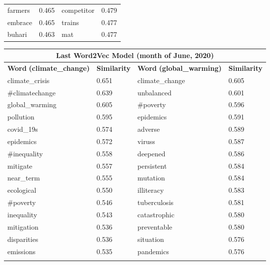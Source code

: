 \documentclass{paper}
\begin{document}
\begin{table}[ht]
\begin{subfigure}{0.49\textwidth}
\begin{tabularx}{\textwidth}{@{}XXXX@{}}
            farmers & 0.465 & competitor & 0.479\\\hdashline
            embrace & 0.465 & trains & 0.477\\\hdashline
            buhari & 0.463 & mat & 0.477\\\bottomrule
        \end{tabularx}
    \end{subfigure}
    \begin{subfigure}{0.49\textwidth}
        \centering
        \begin{tabularx}{\textwidth}{@{}XXXX@{}}\toprule
            \multicolumn{4}{c}{\textbf{Last Word2Vec Model (month of June, 2020)}}\\\midrule
            \textbf{Word} \newline \textbf{\footnotesize{(climate\_change)}}  & \textbf{Similarity} & \textbf{Word} \newline\textbf{\footnotesize{(global\_warming)}}  & \textbf{Similarity} \\\midrule
            climate\_crisis & 0.651 & climate\_change & 0.605\\\hdashline
            \#climatechange & 0.639 & unbalanced & 0.601\\\hdashline
            global\_warming & 0.605 & \#poverty & 0.596\\\hdashline
            pollution & 0.595 & epidemics & 0.591\\\hdashline
            covid\_19s & 0.574 & adverse & 0.589\\\hdashline
            epidemics & 0.572 & viruss & 0.587\\\hdashline
            \#inequality & 0.558 & deepened & 0.586\\\hdashline
            mitigate & 0.557 & persistent & 0.584\\\hdashline
            near\_term & 0.555 & mutation & 0.584\\\hdashline
            ecological & 0.550 & illiteracy & 0.583\\\hdashline
            \#poverty & 0.546 & tuberculosis & 0.581\\\hdashline
            inequality & 0.543 & catastrophic & 0.580\\\hdashline
            mitigation & 0.536 & preventable & 0.580\\\hdashline
            disparities & 0.536 & situation & 0.576\\\hdashline
            emissions\newline  & 0.535 & pandemics & 0.576\\\hdashline

\end{tabularx}
\end{subfigure}
\end{table}
\end{document}
